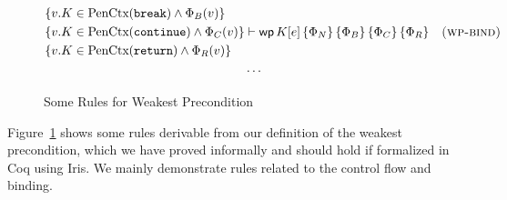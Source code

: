 \documentclass{article}
\numberwithin{algorithm}{section}
\newcommand{\progspec}[1]{\{ #1 \}}
\newcommand{\cmdbreak}{\texttt{break}\,}
\newcommand{\cmdcontinue}{\texttt{continue}}
\newcommand{\cmdreturn}{\texttt{return}\,}
\newcommand{\pure}[1]{\text{PenCtx}(#1)}
\newcommand{\wpre}[5]{\textsf{wp}\, #1\, \progspec{#2}\, \progspec{#3}\, \progspec{#4}\, \progspec{#5}}
\begin{document}
\begin{figure}[h]
$$\begin{aligned}
\begin{aligned}
                            & \progspec{v. K \in \pure{\cmdbreak\!} \land \Phi_B(v)} \\
                            & \progspec{v. K \in \pure{\cmdcontinue} \land \Phi_C(v)} \\
                            & \progspec{v. K \in \pure{\cmdreturn\!} \land \Phi_R(v)}
        \end{aligned} &\vdash \wpre{K[e]}{\Phi_N}{\Phi_B}{\Phi_C}{\Phi_R} & \textsc{(wp-bind)} \\
        &\cdots
    \end{aligned}
    $$
    \caption{Some Rules for Weakest Precondition}
    \label{fig:wp-rules}
\end{figure}

Figure~\ref{fig:wp-rules} shows some rules derivable from our definition of the weakest precondition, which we have proved informally and should hold if formalized in Coq using Iris.
We mainly demonstrate rules related to the control flow and binding.
\end{document}
